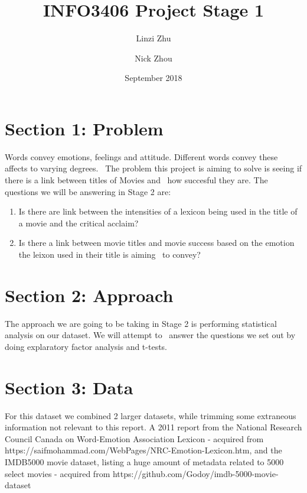 \documentclass[12pt,a4paper]{article}
\begin{document}
\begin{titlepage}
    \title{INFO3406 Project Stage 1}
    \author{Linzi Zhu\\
            \and
            Nick Zhou
    }
    \date{September 2018}
    \maketitle
\end{titlepage}

    \pagebreak
    \tableofcontents
    \pagebreak

    \section{Section 1: Problem}
    Words convey emotions, feelings and attitude. Different words convey these affects to varying degrees. \
    The problem this project is aiming to solve is seeing if there is a link between titles of Movies and \
    how succesful they are.
    \newline \newline
    The questions we will be answering in Stage 2 are:

    \begin{enumerate}
        \item Is there are link between the intensities of a lexicon being used in the title of a movie and the critical acclaim?
        \item Is there a link between movie titles and movie success based on the emotion the leixon used in their title is aiming \
        to convey?

    \end{enumerate}

    \section{Section 2: Approach}
    The approach we are going to be taking in Stage 2 is performing statistical analysis on our dataset. We will attempt to \
    answer the questions we set out by doing explaratory factor analysis and t-tests.

    \section{Section 3: Data}

    For this dataset we combined 2 larger datasets, while trimming some extraneous information not relevant to this report. A 2011 report from the National Research Council Canada on Word-Emotion Association Lexicon - acquired from https://saifmohammad.com/WebPages/NRC-Emotion-Lexicon.htm, and the IMDB5000 movie dataset, listing a huge amount of metadata related to 5000 select movies - acquired from https://github.com/Godoy/imdb-5000-movie-dataset
\end{document}
